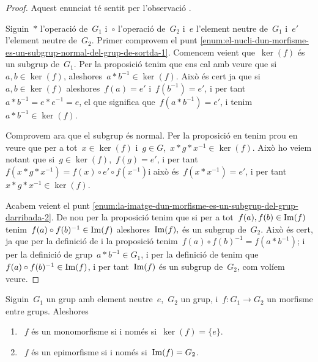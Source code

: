 \documentclass[../../main.tex]{subfiles}
\begin{document}
    \begin{proof}
        Aquest enunciat té sentit per l'observació .

        Siguin~\(\ast\) l'operació de~\(G_{1}\) i~\(\circ\) l'operació de~\(G_{2}\) i~\(e\) l'element neutre de~\(G_{1}\) i~\(e'\) l'element neutre de~\(G_{2}\).
        Primer comprovem el punt \eqref{enum:el-nucli-dun-morfisme-es-un-subgrup-normal-del-grup-de-sortda-1}.
        Comencem veient que~\(\ker(f)\) és un subgrup de~\(G_{1}\).
        Per la proposició  tenim que ens cal amb veure que si~\(a,b\in\ker(f)\), aleshores~\(a\ast b^{-1}\in\ker(f)\).
        Això és cert ja que si~\(a,b\in\ker(f)\) aleshores~\(f(a)=e'\) i~\(f(b^{-1})=e'\), i per tant~\(a\ast b^{-1}=e\ast e^{-1}=e\), el que significa que~\(f(a\ast b^{-1})=e'\), i tenim~\(a\ast b^{-1}\in\ker(f)\).

        Comprovem ara que el subgrup és normal.
        Per la proposició  en tenim prou en veure que per a tot~\(x\in\ker(f)\) i~\(g\in G\),~\(x\ast g\ast x^{-1}\in\ker(f)\).
        Això ho veiem notant que si~\(g\in\ker(f)\),~\(f(g)=e'\), i per tant~\(f(x\ast g\ast x^{-1})=f(x)\circ e'\circ f(x^{-1})\)i això és~\(f(x\ast x^{-1})=e'\), i per tant~\(x\ast g\ast x^{-1}\in\ker(f)\).

        Acabem veient el punt \eqref{enum:la-imatge-dun-morfisme-es-un-subgrup-del-grup-darribada-2}.
        De nou per la proposició  tenim que si per a tot~\(f(a),f(b)\in\operatorname{Im}(f)\) tenim~\(f(a)\circ f(b)^{-1}\in\operatorname{Im}(f)\) aleshores~\(\operatorname{Im}(f),\) és un subgrup de~\(G_{2}\).
        Això és cert, ja que per la definició de  i la proposició  tenim~\(f(a)\circ f(b)^{-1}=f(a\ast b^{-1})\); i per la definició de grup~\(a\ast b^{-1}\in G_{1}\), i per la definició de  tenim que~\(f(a)\circ f(b)^{-1}\in\operatorname{Im}(f)\), i per tant~\(\operatorname{Im}(f)\) és un subgrup de~\(G_{2}\), com volíem veure.
    \end{proof}
    \begin{proposition}
        \label{prop:condicions-equivalents-a-monomorfisme-i-epimorfisme-per-nucli-i-imatge}
        Siguin~\(G_{1}\) un grup amb element neutre~\(e\),~\(G_{2}\) un grup, i~\(f\colon G_{1}\to G_{2}\) un morfisme entre grups.
        Aleshores
        \begin{enumerate}
            \item\label{enum:condicions-equivalents-a-monomorfisme-i-epimorfisme-per-nucli-i-imatge-1}~\(f\) és un monomorfisme si i només si~\(\ker(f)=\{e\}\).
            \item\label{enum:condicions-equivalents-a-monomorfisme-i-epimorfisme-per-nucli-i-imatge-2}~\(f\) és un epimorfisme si i només si~\(\operatorname{Im}(f)=G_{2}\).
        \end{enumerate}
    \end{proposition}
\end{document}
